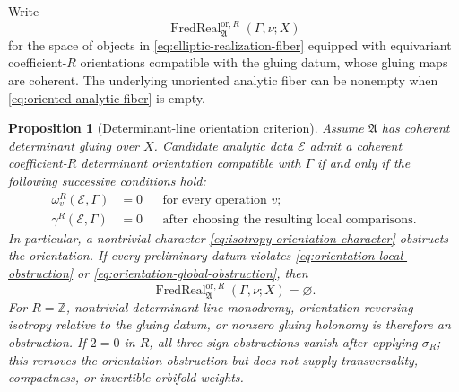 \documentclass[11pt,letterpaper,twoside]{article}
\theoremstyle{plain}
\newtheorem{proposition}[theorem]{Proposition}
\theoremstyle{definition}
\theoremstyle{remark}
\begin{document}
Write
\begin{equation}\label{eq:oriented-analytic-fiber}
 \operatorname{FredReal}^{\mathrm{or},R}_{\mathfrak A}
 (\Gamma,\nu;X)
\end{equation}
for the space of objects in \eqref{eq:elliptic-realization-fiber} equipped with equivariant coefficient-$R$ orientations compatible with the gluing datum, whose gluing maps are coherent.  The underlying unoriented analytic fiber can be nonempty when \eqref{eq:oriented-analytic-fiber} is empty.

\begin{proposition}[Determinant-line orientation criterion]\label{prop:orientation-criterion}
Assume $\mathfrak A$ has coherent determinant gluing over $X$.  Candidate analytic data $\mathcal E$ admit a coherent coefficient-$R$ determinant orientation compatible with $\Gamma$ if and only if the following successive conditions hold:
\begin{align}
 \omega^R_v(\mathcal E,\Gamma)&=0
 &&\text{for every operation $v$};
 \label{eq:orientation-local-obstruction}\\
 \gamma^R(\mathcal E,\Gamma)&=0
 &&\text{after choosing the resulting local comparisons.}
 \label{eq:orientation-global-obstruction}
\end{align}
In particular, a nontrivial character \eqref{eq:isotropy-orientation-character} obstructs the orientation.  If every preliminary datum violates \eqref{eq:orientation-local-obstruction} or \eqref{eq:orientation-global-obstruction}, then
\[
 \operatorname{FredReal}^{\mathrm{or},R}_{\mathfrak A}
 (\Gamma,\nu;X)=\varnothing.
\]
For $R=\mathbb Z$, nontrivial determinant-line monodromy, orientation-reversing isotropy relative to the gluing datum, or nonzero gluing holonomy is therefore an obstruction.  If $2=0$ in $R$, all three sign obstructions vanish after applying $\sigma_R$; this removes the orientation obstruction but does not supply transversality, compactness, or invertible orbifold weights.
\end{proposition}
\end{document}
